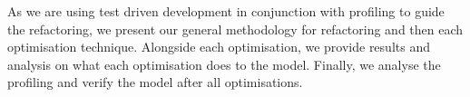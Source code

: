 As we are using test driven development in conjunction with profiling to guide the refactoring, we present our general methodology for refactoring and then each optimisation technique.
Alongside each optimisation, we provide results and analysis on what each optimisation does to the model.
Finally, we analyse the profiling and verify the model after all optimisations.










